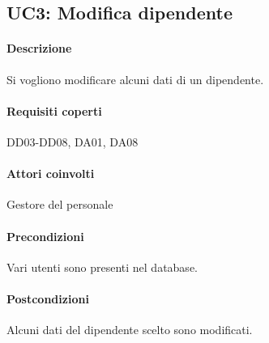 \subsection{UC3: Modifica dipendente}
\paragraph{Descrizione}
Si vogliono modificare alcuni dati di un dipendente.
\paragraph{Requisiti coperti}
DD03-DD08, DA01, DA08
\paragraph{Attori coinvolti}
Gestore del personale
\paragraph{Precondizioni}
Vari utenti sono presenti nel database.
\paragraph{Postcondizioni}
Alcuni dati del dipendente scelto sono modificati.
